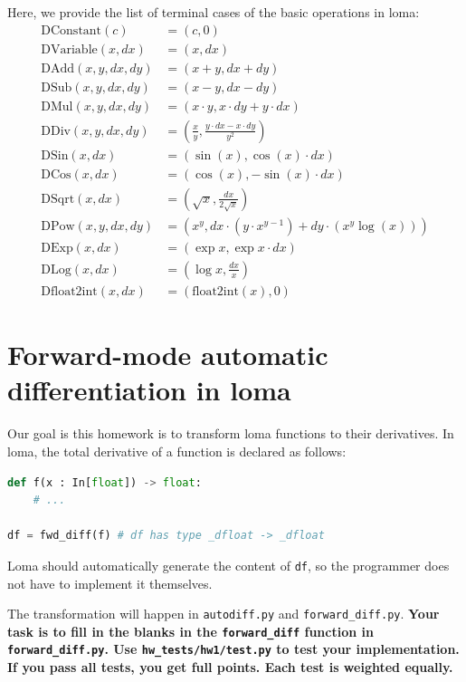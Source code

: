 Here, we provide the list of terminal cases of the basic operations in loma:
\begin{equation}
\begin{aligned}
\text{DConstant}(c) &= (c, 0) \\
\text{DVariable}(x, dx) &= (x, dx) \\
\text{DAdd}(x, y, dx, dy) &= (x + y, dx + dy) \\
\text{DSub}(x, y, dx, dy) &= (x - y, dx - dy) \\
\text{DMul}(x, y, dx, dy) &= (x \cdot y, x \cdot dy + y \cdot dx) \\
\text{DDiv}(x, y, dx, dy) &= \left(\frac{x}{y}, \frac{y \cdot dx - x \cdot dy}{y^2}\right) \\
\text{DSin}(x, dx) &= \left(\sin(x), \cos(x) \cdot dx\right) \\
\text{DCos}(x, dx) &= \left(\cos(x), -\sin(x) \cdot dx\right) \\
\text{DSqrt}(x, dx) &= \left(\sqrt{x}, \frac{dx}{2\sqrt{x}}\right) \\
\text{DPow}(x, y, dx, dy) &= \left(x^y, dx \cdot \left(y \cdot x^{y-1}\right) + dy \cdot \left(x^y \log(x)\right)\right) \\
\text{DExp}(x, dx) &= \left(\exp{x}, \exp{x} \cdot dx\right) \\
\text{DLog}(x, dx) &= \left(\log{x}, \frac{dx}{x}\right) \\
\text{Dfloat2int}(x, dx) &= \left(\text{float2int}(x), 0\right)
\end{aligned}
\end{equation}

\section{Forward-mode automatic differentiation in loma}

Our goal is this homework is to transform loma functions to their derivatives. In loma, the total derivative of a function is declared as follows:
\begin{lstlisting}[language=Python]
def f(x : In[float]) -> float:
    # ...

df = fwd_diff(f) # df has type _dfloat -> _dfloat
\end{lstlisting}

Loma should automatically generate the content of \lstinline{df}, so the programmer does not have to implement it themselves.

The transformation will happen in \lstinline{autodiff.py} and \lstinline{forward_diff.py}. \textbf{Your task is to fill in the blanks in the \lstinline{forward_diff} function in \lstinline{forward_diff.py}. Use \lstinline{hw_tests/hw1/test.py} to test your implementation. If you pass all tests, you get full points. Each test is weighted equally.}

